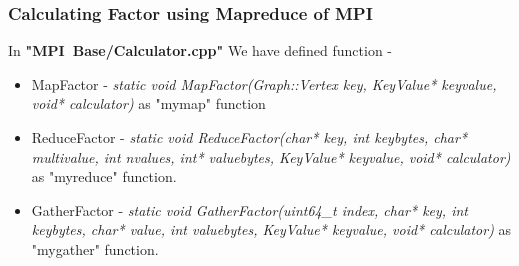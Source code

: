 \documentclass{article}
\begin{document}
    \subsubsection{Calculating Factor using Mapreduce of MPI}
    In \textbf{"MPI\ Base/Calculator.cpp"} We have defined function - 
    \begin{itemize}
        \item MapFactor - \textit{static void MapFactor(Graph::Vertex key, KeyValue* keyvalue, void*
        calculator)} as "mymap" function
        \item ReduceFactor - \textit{static void ReduceFactor(char* key, int keybytes, char* multivalue, int nvalues, int* valuebytes, KeyValue* keyvalue, void* calculator)} as "myreduce" function.
        \item GatherFactor - \textit{static void GatherFactor(uint64\_t index, char* key, int keybytes, char* value, int valuebytes, KeyValue* keyvalue, void* calculator)} as "mygather" function.
    \end{itemize}
    
    

    
\end{document}
